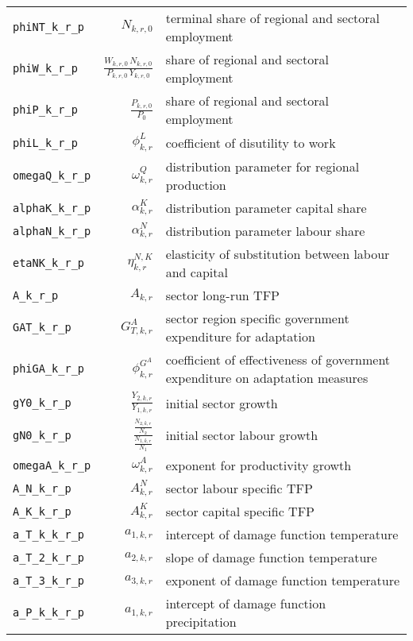 \begin{center}
\begin{longtable}{lrl}
\texttt{phiNT\_k\_r\_p} & ${N_{k,r,0}}$ & terminal share of regional and sectoral employment\\
\texttt{phiW\_k\_r\_p} & $\frac{W_{k,r,0} \, N_{k,r,0}}{P_{k,r,0} \, Y_{k,r,0}}$ & share of regional and sectoral employment\\
\texttt{phiP\_k\_r\_p} & $\frac{P_{k,r,0}}{P_{0}}$ & share of regional and sectoral employment\\
\texttt{phiL\_k\_r\_p} & ${\phi^{L}_{k,r}}$ & coefficient of disutility to work\\
\texttt{omegaQ\_k\_r\_p} & ${\omega^{Q}_{k,r}}$ & distribution parameter for regional production\\
\texttt{alphaK\_k\_r\_p} & ${\alpha^{K}_{k,r}}$ & distribution parameter capital share\\
\texttt{alphaN\_k\_r\_p} & ${\alpha^{N}_{k,r}}$ & distribution parameter labour share\\
\texttt{etaNK\_k\_r\_p} & ${\eta^{N,K}_{k,r}}$ & elasticity of substitution between labour and capital\\
\texttt{A\_k\_r\_p} & ${A_{k,r}}$ & sector long-run TFP\\
\texttt{GAT\_k\_r\_p} & ${G^{A}_{T,k,r}}$ & sector region specific government expenditure for adaptation\\
\texttt{phiGA\_k\_r\_p} & ${\phi^{G^{A}}_{k,r}}$ & coefficient of effectiveness of government expenditure on adaptation measures\\
\texttt{gY0\_k\_r\_p} & ${\frac{Y_{2,k,r}}{Y_{1,k,r}}}$ & initial sector growth\\
\texttt{gN0\_k\_r\_p} & $\frac{\frac{N_{2,k,r}}{N_{2}}}{\frac{N_{1,k,r}}{N_{1}}}$ & initial sector labour growth\\
\texttt{omegaA\_k\_r\_p} & ${\omega^{A}_{k,r}}$ & exponent for productivity growth\\
\texttt{A\_N\_k\_r\_p} & ${A^{N}_{k,r}}$ & sector labour specific TFP\\
\texttt{A\_K\_k\_r\_p} & ${A^{K}_{k,r}}$ & sector capital specific TFP\\
\texttt{a\_T\_k\_k\_r\_p} & ${a_{1,k,r}}$ & intercept of damage function temperature\\
\texttt{a\_T\_2\_k\_r\_p} & ${a_{2,k,r}}$ & slope of damage function temperature\\
\texttt{a\_T\_3\_k\_r\_p} & ${a_{3,k,r}}$ & exponent of damage function temperature\\
\texttt{a\_P\_k\_k\_r\_p} & ${a_{1,k,r}}$ & intercept of damage function precipitation\\

\end{longtable}
\end{center}
